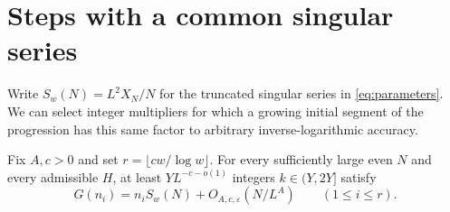 \section{Steps with a common singular series}\label{sec:sparse}

Write \(S_w(N)=L^2X_N/N\) for the truncated singular series in
\eqref{eq:parameters}. We can select integer multipliers for which a
growing initial segment of the progression has this same factor to
arbitrary inverse-logarithmic accuracy.

\begin{theorem}\label{thm:sparse}
Fix \(A,c>0\) and set \(r=\lfloor cw/\log w\rfloor\).
For every sufficiently large even \(N\) and every admissible \(H\),
at least \(Y L^{-c-o(1)}\) integers \(k\in(Y,2Y]\) satisfy
\begin{equation}\label{eq:sparse}
    G(n_i)=n_i S_w(N)+O_{A,c,\varepsilon}(N/L^A)
    \qquad (1\le i\le r).
\end{equation}
\end{theorem}

